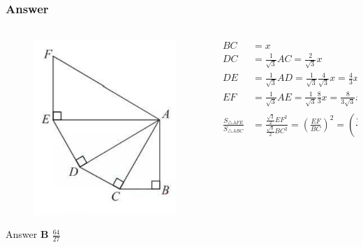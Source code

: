 \documentclass[
	11pt, %
]{beamer}
\begin{document}
\begin{frame}
	\frametitle{Answer}
	\framesubtitle{}
	\begin{columns}[t] 
		\begin{column}{0.3\textwidth} %
			\begin{figure}
				\includegraphics[width=\linewidth]{Similar_Triangle_Example_Question2_1.png}
			\end{figure}
			\pause
			Answer \textbf{B $\frac{64}{27}$}		
		\end{column}
		\begin{column}{0.7\textwidth} %
			\pause
	     \begin{equation*}
					\begin{aligned}
					BC &= x\\
					DC &= \frac{1}{\sqrt{3}} AC = \frac{2}{\sqrt{3}} x\\
					DE &= \frac{1}{\sqrt{3}} AD = \frac{1}{\sqrt{3}}\frac{4}{\sqrt{3}} x
					   = \frac{4}{3} x \\
					EF &= \frac{1}{\sqrt{3}} AE = \frac{1}{\sqrt{3}} \frac{8}{3} x =
					   \frac{8}{3\sqrt{3}} x\\
					\frac{S_{\triangle AFE}}{S_{\triangle ABC}} &= \frac{\frac{\sqrt{3}}{2}EF^2}{\frac{\sqrt{3}}{2}BC^2}
					   = (\frac{EF}{BC})^2 = (\frac{\frac{8}{3\sqrt{3}} x}{x})^2 
					   = \frac{64}{27}
					\end{aligned}
				\end{equation*}					
		\end{column}
	\end{columns}
\end{frame}
\end{document}
